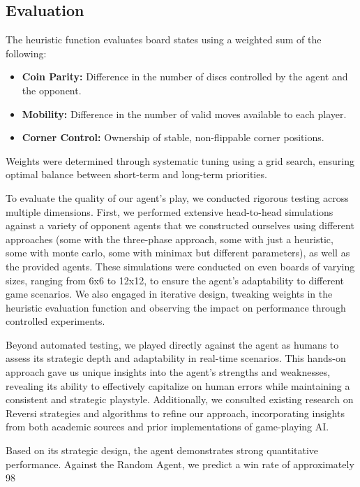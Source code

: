 \documentclass[11pt]{article}
\begin{document}
\subsection*{Evaluation}
The heuristic function evaluates board states using a weighted sum of the following:
\begin{itemize}
    \item \textbf{Coin Parity:} Difference in the number of discs controlled by the agent and the opponent.
    \item \textbf{Mobility:} Difference in the number of valid moves available to each player.
    \item \textbf{Corner Control:} Ownership of stable, non-flippable corner positions.
\end{itemize}
Weights were determined through systematic tuning using a grid search, ensuring optimal balance between short-term and long-term priorities.


To evaluate the quality of our agent's play, we conducted rigorous testing across multiple dimensions. First, we performed extensive head-to-head simulations against a variety of opponent agents that we constructed ourselves using different approaches (some with the three-phase approach, some with just a heuristic, some with monte carlo, some with minimax but different parameters), as well as the provided agents. These simulations were conducted on even boards of varying sizes, ranging from 6x6 to 12x12, to ensure the agent's adaptability to different game scenarios. We also engaged in iterative design, tweaking weights in the heuristic evaluation function and observing the impact on performance through controlled experiments.

Beyond automated testing, we played directly against the agent as humans to assess its strategic depth and adaptability in real-time scenarios. This hands-on approach gave us unique insights into the agent’s strengths and weaknesses, revealing its ability to effectively capitalize on human errors while maintaining a consistent and strategic playstyle. Additionally, we consulted existing research on Reversi strategies and algorithms to refine our approach, incorporating insights from both academic sources and prior implementations of game-playing AI.

Based on its strategic design, the agent demonstrates strong quantitative performance. Against the Random Agent, we predict a win rate of approximately 98%
\end{document}
